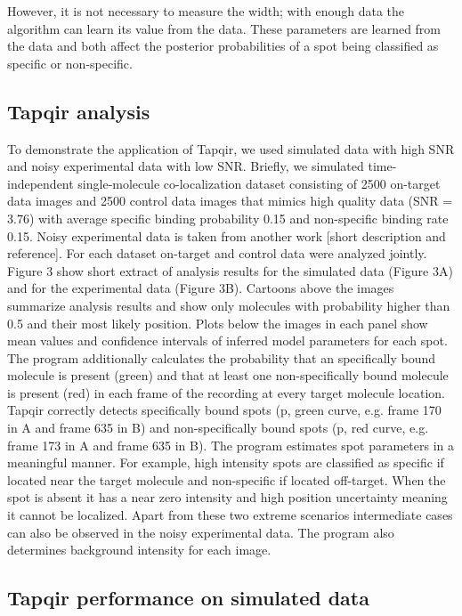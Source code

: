 However, it is not necessary to measure the width; with enough data the algorithm can learn its value from the data.  These parameters are learned from the data and both affect the posterior probabilities of a spot being classified as specific or non-specific.

\subsection*{Tapqir analysis} %

To demonstrate the application of Tapqir, we used simulated data with high SNR and noisy experimental data with low SNR. Briefly, we simulated time-independent single-molecule co-localization dataset consisting of 2500 on-target data images and 2500 control data images that mimics high quality data (SNR = 3.76) with average specific binding probability 0.15 and non-specific binding rate 0.15. Noisy experimental data is taken from another work [short description and reference]. For each dataset on-target and control data were analyzed jointly. Figure 3 show short extract of analysis results for the simulated data (Figure 3A) and for the experimental data (Figure 3B). Cartoons above the images summarize analysis results and show only molecules with probability higher than 0.5 and their most likely position. Plots below the images in each panel show mean values and confidence intervals of inferred model parameters for each spot. The program additionally calculates the probability that an specifically bound molecule is present (green) and that at least one non-specifically bound molecule is present (red) in each frame of the recording at every target molecule location. Tapqir correctly detects specifically bound spots (p, green curve, e.g. frame 170 in A and frame 635 in B) and non-specifically bound spots (p, red curve, e.g. frame 173 in A and frame 635 in B). The program estimates spot parameters in a meaningful manner. For example, high intensity spots are classified as specific if located near the target molecule and non-specific if located off-target. When the spot is absent it has a near zero intensity and high position uncertainty meaning it cannot be localized. Apart from these two extreme scenarios intermediate cases can also be observed in the noisy experimental data. The program also determines background intensity for each image. %

\subsection*{Tapqir performance on simulated data} %

